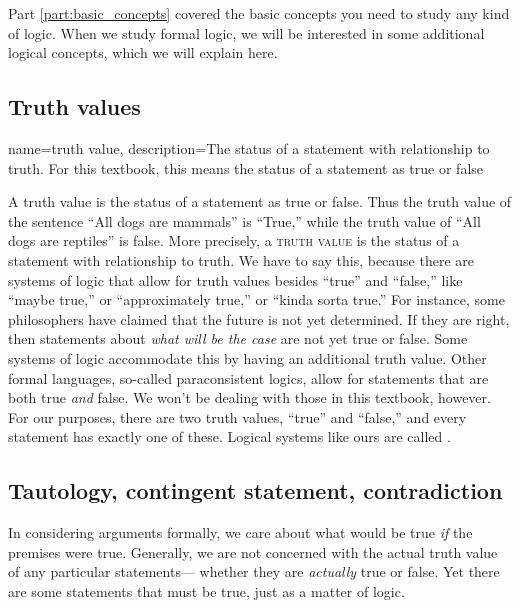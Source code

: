 Part \ref{part:basic_concepts} covered the basic concepts you need to study any kind of logic. When we study formal logic, we will be interested in some additional logical concepts, which we will explain here. 


\subsection{Truth values}

{
  name=truth value,
  description={The status of a statement with relationship to truth. For  this textbook, this means the status of a statement as true or false}
}


A truth value is the status of a statement as true or false. Thus the truth value of the sentence ``All dogs are mammals'' is ``True,'' while the truth value of ``All dogs are reptiles'' is false. More precisely, a \textsc{\gls{truth value}} \label{def:Truth_value} is the status of a statement with relationship to truth. We have to say this, because there are systems of logic that allow for truth values besides ``true'' and ``false,'' like ``maybe true,'' or ``approximately true,'' or ``kinda sorta true.'' For instance, some philosophers have claimed that the future is not yet determined. If they are right, then statements about \emph{what will be the case} are not yet true or false. Some systems of logic accommodate this by having an additional truth value. Other formal languages, so-called paraconsistent logics, allow for statements that are both true \emph{and} false. We won't be dealing with those in this textbook, however. For our purposes, there are two truth values, ``true'' and ``false,'' and every statement has exactly one of these. Logical systems like ours are called . \label{defBivalent}








\subsection{Tautology, contingent statement, contradiction}

In considering arguments formally, we care about what would be true \emph{if} the premises were true. Generally, we are not concerned with the actual truth value of any particular statements--- whether they are \emph{actually} true or false. Yet there are some statements that must be true, just as a matter of logic.

